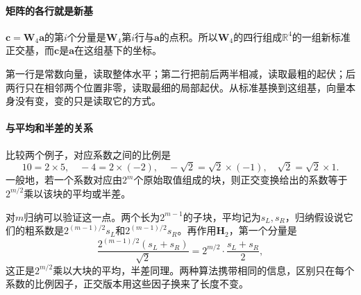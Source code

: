 \paragraph{矩阵的各行就是新基}
$\bm c=\bm W_4\bm a$的第$i$个分量是$\bm W_4$第$i$行与$\bm a$的点积。所以$\bm W_4$的四行组成$\mathbb R^4$的一组新标准正交基，而$\bm c$是$\bm a$在这组基下的坐标。

第一行是常数向量，读取整体水平；第二行把前后两半相减，读取最粗的起伏；后两行只在相邻两个位置非零，读取最细的局部起伏。从标准基换到这组基，向量本身没有变，变的只是读取它的方式。

\paragraph{与平均和半差的关系}
比较两个例子，对应系数之间的比例是
\[
 10=2\times5,\quad-4=2\times(-2),\quad-\sqrt2=\sqrt2\times(-1),\quad\sqrt2=\sqrt2\times1.
\]
一般地，若一个系数对应由$2^m$个原始取值组成的块，则正交变换给出的系数等于$2^{m/2}$乘以该块的平均或半差。

对$m$归纳可以验证这一点。两个长为$2^{m-1}$的子块，平均记为$s_L,s_R$，归纳假设说它们的粗系数是$2^{(m-1)/2}s_L$和$2^{(m-1)/2}s_R$。再作用$\bm H_2$，第一个分量是
\[
 \frac{2^{(m-1)/2}(s_L+s_R)}{\sqrt2}=2^{m/2}\cdot\frac{s_L+s_R}{2},
\]
这正是$2^{m/2}$乘以大块的平均，半差同理。两种算法携带相同的信息，区别只在每个系数的比例因子，正交版本用这些因子换来了长度不变。
